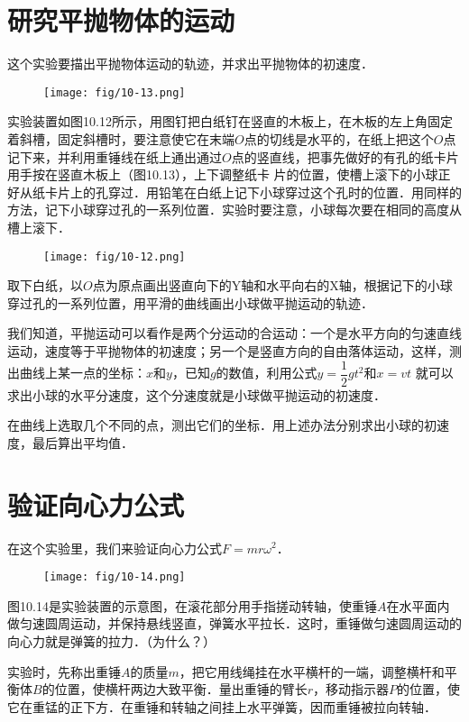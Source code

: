 \section{研究平抛物体的运动}

这个实验要描出平抛物体运动的轨迹，并求出平抛物体的初速度．
\begin{figure}[htp]\centering
    \texttt{[image: fig/10-13.png]}
    \caption{}
    \end{figure}

实验装置如图10.12所示，用图钉把白纸钉在竖直的木板上，在木板的左上角固定着斜槽，固定斜槽时，要注意使它在末端$O$点的切线是水平的，在纸上把这个$O$点记下来，并利用重锤线在纸上通出通过$O$点的竖直线，把事先做好的有孔的纸卡片用手按在竖直木板上（图10.13），上下调整纸卡
片的位置，使槽上滚下的小球正好从纸卡片上的孔穿过．用铅笔在白纸上记下小球穿过这个孔时的位置．用同样的方法，记下小球穿过孔的一系列位置．实验时要注意，小球每次要在相同的高度从槽上滚下．
\begin{figure}[htp]
    \centering
    \texttt{[image: fig/10-12.png]}
    \caption{}
\end{figure}

取下白纸，以$O$点为原点画出竖直向下的Y轴和水平向右的X轴，根据记下的小球穿过孔的一系列位置，用平滑的曲线画出小球做平抛运动的轨迹．

我们知道，平抛运动可以看作是两个分运动的合运动：一个是水平方向的匀速直线运动，速度等于平抛物体的初速度；另一个是竖直方向的自由落体运动，这样，测出曲线上某一点的坐标：$x$和$y$，已知$g$的数值，利用公式$y=\dfrac{1}{2}gt^2$和$x=vt$
就可以求出小球的水平分速度，这个分速度就是小球做平抛运动的初速度．

在曲线上选取几个不同的点，测出它们的坐标．用上述办法分别求出小球的初速度，最后算出平均值．

\section{验证向心力公式}
在这个实验里，我们来验证向心力公式$F=mr\omega^2$．
\begin{figure}[htp]\centering
    \texttt{[image: fig/10-14.png]}
    \caption{}
    \end{figure}

图10.14是实验装置的示意图，在滚花部分用手指搓动转轴，使重锤$A$在水平面内做匀速圆周运动，并保持悬线竖直，弹簧水平拉长．这时，重锤做匀速圆周运动的向心力就是弹簧的拉力．（为什么？）

实验时，先称出重锤$A$的质量$m$，把它用线绳挂在水平横杆的一端，调整横杆和平衡体$B$的位置，使横杆两边大致平衡．量出重锤的臂长$r$，移动指示器$P$的位置，使它在重锰的正下方．在重锤和转轴之间挂上水平弹簧，因而重锤被拉向转轴．

